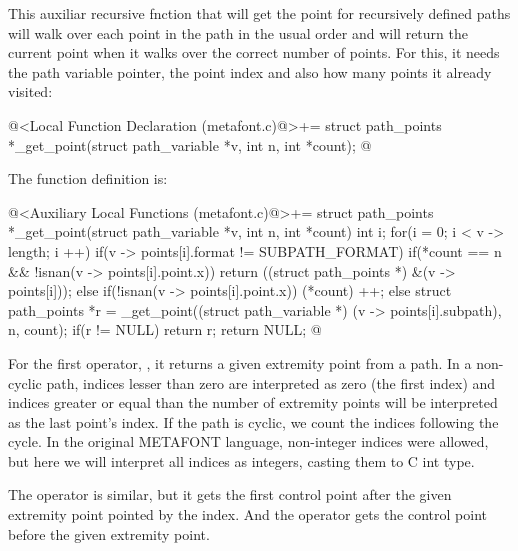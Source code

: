 {{{{{This auxiliar recursive fnction that will get the point for
recursively defined paths will walk over each point in the path in the
usual order and will return the current point when it walks over the
correct number of points. For this, it needs the path variable
pointer, the point index and also how many points it already visited:

\iniciocodigo
@<Local Function Declaration (metafont.c)@>+=
struct path_points *_get_point(struct path_variable *v, int n, int *count);
@
\fimcodigo

The function definition is:

\iniciocodigo
@<Auxiliary Local Functions (metafont.c)@>+=
struct path_points *_get_point(struct path_variable *v, int n, int *count){
  int i;
  for(i = 0; i < v -> length; i ++){
    if(v -> points[i].format != SUBPATH_FORMAT) {
      if(*count == n && !isnan(v -> points[i].point.x))
	return ((struct path_points *) &(v -> points[i]));
      else if(!isnan(v -> points[i].point.x))
	(*count) ++;
    }
    else{
      struct path_points *r =
	_get_point((struct path_variable *) (v -> points[i].subpath),
		   n, count);
      if(r != NULL)
	return r;
    }
  }
  return NULL;
}
@
\fimcodigo


For the first operator, , it returns a given
extremity point from a path. In a non-cyclic path, indices lesser than
zero are interpreted as zero (the first index) and indices greater or
equal than the number of extremity points will be interpreted as the
last point's index. If the path is cyclic, we count the indices
following the cycle. In the original METAFONT language, non-integer
indices were allowed, but here we will interpret all indices as
integers, casting them to C int type.

The operator  is similar, but it gets the
first control point after the given extremity point pointed by the
index. And the operator  gets the control point
before the given extremity point.

}}}}}

